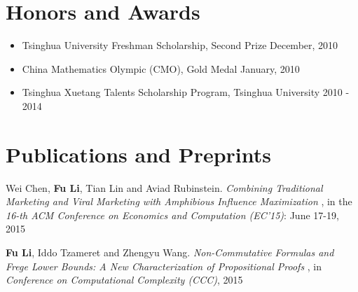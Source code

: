 \documentclass[margin,line]{res}
\newenvironment{list1}{
  \begin{list}{\ding{113}}{%
      \setlength{\itemsep}{0in}
      \setlength{\parsep}{0in} \setlength{\parskip}{0in}
      \setlength{\topsep}{0in} \setlength{\partopsep}{0in}
      \setlength{\leftmargin}{0.17in}}}{\end{list}}
\newenvironment{list2}{
  \begin{list}{$\bullet$}{%
      \setlength{\itemsep}{0in}
      \setlength{\parsep}{0in} \setlength{\parskip}{0in}
      \setlength{\topsep}{0in} \setlength{\partopsep}{0in}
      \setlength{\leftmargin}{0.2in}}}{\end{list}}
\begin{document}
\begin{resume}


\section{\sc Honors and Awards}

\begin{itemize}
  \item Tsinghua University Freshman Scholarship, Second Prize \hfill December, 2010
  \item China Mathematics Olympic (CMO), Gold Medal \hfill January, 2010
  \item Tsinghua Xuetang Talents Scholarship Program, Tsinghua University \hfill 2010 - 2014
\end{itemize}


\section{\sc  Publications and Preprints}


Wei Chen, {\bf Fu Li},  Tian Lin and Aviad Rubinstein. \textit{Combining Traditional Marketing and Viral Marketing with Amphibious Influence Maximization
}, in the \textit{16-th ACM Conference on Economics and Computation (EC'15)}: June 17-19, 2015


{\bf Fu Li}, Iddo Tzameret and Zhengyu Wang. \textit{ Non-Commutative Formulas and Frege Lower Bounds: A New Characterization of Propositional Proofs
}, in\textit{ Conference on Computational Complexity  (CCC)}, 2015



\end{resume}
\end{document}
